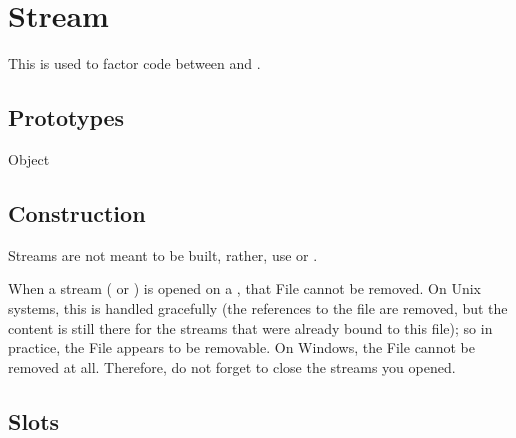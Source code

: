 
\section{Stream}

This is used to factor code between  and
.

\subsection{Prototypes}
\begin{refObjects}
\item[Object]
\end{refObjects}

\subsection{Construction}
\label{sec:specs:Stream:ctor}

Streams are not meant to be built, rather, use  or
.

When a stream ( or ) is
opened on a , that File cannot be removed.  On Unix systems,
this is handled gracefully (the references to the file are removed, but the
content is still there for the streams that were already bound to this
file); so in practice, the File appears to be removable.  On Windows, the
File cannot be removed at all.  Therefore, do not forget to close the
streams you opened.

\subsection{Slots}

